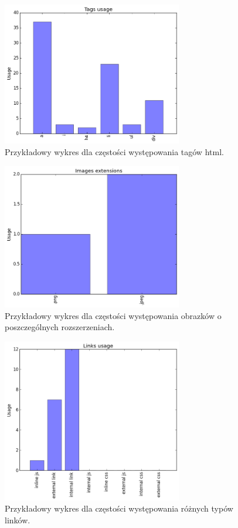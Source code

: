 \documentclass[12pt]{article}
\begin{document}
\begin{figure}[h]
\centering
\caption{Przykładowy wykres dla częstości występowania tagów html.}
\label{img:wykresTagi}
\includegraphics[width=0.7\textwidth]{WykresTagi.png}
\end{figure}

\begin{figure}[h]
\centering
\caption{Przykładowy wykres dla częstości występowania obrazków o poszczególnych rozszerzeniach.}
\label{img:wykresObrazki}
\includegraphics[width=0.7\textwidth]{WykresObrazki.png}
\end{figure}

\begin{figure}[h]
\centering
\caption{Przykładowy wykres dla częstości występowania różnych typów linków.}
\label{img:wykresLinków}
\includegraphics[width=0.7\textwidth]{WykresLinki.png}
\end{figure}
\end{document}
